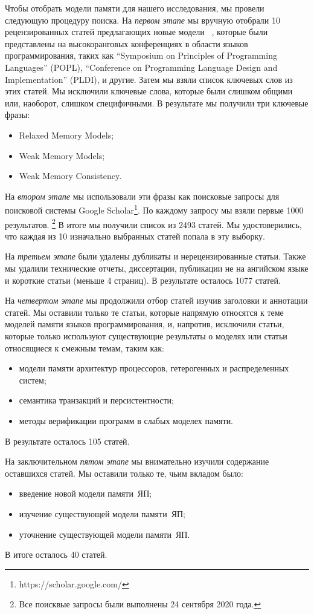 Чтобы отобрать модели памяти для нашего исследования, 
мы провели следующую процедуру поиска. 
На \emph{первом этапе} мы вручную отобрали 10 рецензированных статей 
предлагающих новые модели~%
\cite{
Manson-al:POPL05,
Batty-al:POPL11,
Lahav-al:PLDI17,
Dolan-al:PLDI18,
Watt-al:PLDI2020,
Jeffrey-Riely:LICS16,
PichonPharabod-Sewell:POPL16,
Kang-al:POPL17,
Chakraborty-Vafeiadis:POPL19,
Paviotti-al:ESOP20
},
которые были представлены на высокоранговых конференциях
в области языков программирования, таких как
``Symposium on Principles of Programming Languages'' (POPL),
``Conference on Programming Language Design and Implementation'' (PLDI), 
и другие. Затем мы взяли список ключевых слов из этих статей. 
Мы исключили ключевые слова, которые были слишком общими
или, наоборот, слишком специфичными. 
В результате мы получили три ключевые фразы:
\begin{itemize}
  \item Relaxed Memory Models;
  \item Weak Memory Models;
  \item Weak Memory Consistency.
\end{itemize}
 
На \emph{втором этапе} мы использовали эти фразы как 
поисковые запросы для поисковой системы Google Scholar\footnote{https://scholar.google.com/}.
По каждому запросу мы взяли первые 1000 результатов.%
\footnote{Все поисквые запросы были выполнены 24 сентября 2020 года.}
В итоге мы получили список из 2493 статей. 
Мы удостоверились, что каждая из 10 изначально выбранных статей 
попала в эту выборку. 

На \emph{третьем этапе} были удалены дубликаты и нерецензированные статьи. 
Также мы удалили технические отчеты, диссертации, 
публикации не на ангийском языке и короткие статьи (меньше 4 страниц). 
В результате осталось 1077 статей. 

На \emph{четвертом этапе} мы продолжили отбор статей изучив 
заголовки и аннотации статей. 
Мы оставили только те статьи, которые напрямую относятся 
к теме моделей памяти языков программирования, 
и, напротив, исключили статьи, которые только используют 
существующие результаты о моделях или статьи относящиеся 
к смежным темам, таким как:
\begin{itemize}
  \item модели памяти архитектур процессоров, гетерогенных и распределенных систем;
  \item семантика транзакций и персистентности;
  \item методы верификации программ в слабых моделех памяти.
\end{itemize}
В результате осталось 105 статей.

На заключительном \emph{пятом этапе} мы внимательно изучили содержание оставшихся статей. 
Мы оставили только те, чьим вкладом было:
\begin{itemize}
  \item введение новой модели памяти~ЯП;
  \item изучение существующей модели памяти~ЯП;
  \item уточнение существующей модели памяти~ЯП.
\end{itemize}
В итоге осталось 40 статей.


